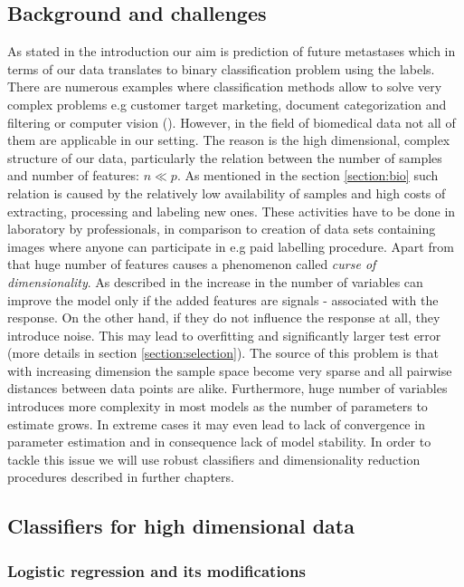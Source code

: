 \documentclass[12pt, wide]{mwart}
\begin{document}
\subsection{Background and challenges} \label{section:challenges}

As stated in the introduction our aim is prediction of future metastases which in terms of our data translates to binary classification problem using the labels. There are numerous examples where classification methods allow to solve very complex problems e.g customer target marketing, document categorization and filtering or computer vision (\cite{dataClassification}). However, in the field of biomedical data not all of them are applicable in our setting. The reason is the high dimensional, complex structure of our data, particularly the relation between the number of samples and number of features: $n \ll p$. As mentioned in the section \ref{section:bio} such relation is caused by the relatively low availability of samples and high costs of extracting, processing and labeling new ones. These activities have to be done in laboratory by professionals, in comparison to creation of data sets containing images where anyone can participate in e.g paid labelling procedure. Apart from that huge number of features causes a phenomenon called \textit{curse of dimensionality}. As described in \cite{ISL} the increase in the number of variables can improve the model only if the added features are signals - associated with the response. On the other hand, if they do not influence the response at all, they introduce noise. This may lead to overfitting and significantly larger test error (more details in section \ref{section:selection}). The source of this problem is that with increasing dimension the sample space become very sparse and all pairwise distances between data points are alike. Furthermore, huge number of variables introduces more complexity in most models as the number of parameters to estimate grows. In extreme cases it may even lead to lack of convergence in parameter estimation and in consequence lack of model stability. In order to tackle this issue we will use robust classifiers and dimensionality reduction procedures described in further chapters.

\subsection{Classifiers for high dimensional data}

\subsubsection{Logistic regression and its modifications}
\end{document}

